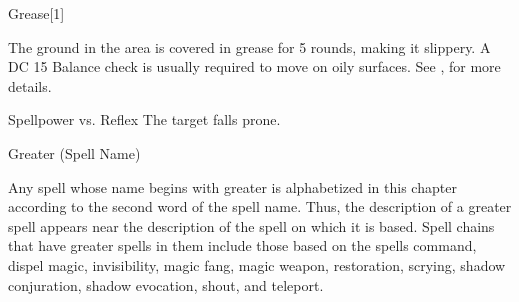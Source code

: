 \begin{spellsection}{Grease}[1]
    \begin{spellheader}
    \end{spellheader}
    \begin{spellcontent}
        \begin{spelltargetinginfo}
        \end{spelltargetinginfo}
        \begin{spelleffects}
            \spelleffect The ground in the area is covered in grease for 5 rounds, making it slippery. A DC 15 Balance check is usually required to move on oily surfaces. See , for more details.
        \end{spelleffects}
    \end{spellcontent}
    \begin{spellsubcontent}
        \begin{spelltargetinginfo}
        \end{spelltargetinginfo}
        \begin{spelleffects}
            \begin{spellattack}{Spellpower vs. Reflex}
                \spellsuccess The target falls prone.
            \end{spellattack}
        \end{spelleffects}
    \end{spellsubcontent}
    \begin{spellfooter}
        \spellnotes \physicalspellnotes
        \miscastyou
    \end{spellfooter}
\end{spellsection}

\begin{spellsection}{Greater (Spell Name)}
    \par Any spell whose name begins with greater is alphabetized in this chapter according to the second word of the spell name. Thus, the description of a greater spell appears near the description of the spell on which it is based. Spell chains that have greater spells in them include those based on the spells command, dispel magic, invisibility, magic fang, magic weapon, restoration, scrying, shadow conjuration, shadow evocation, shout, and teleport.
\end{spellsection}

